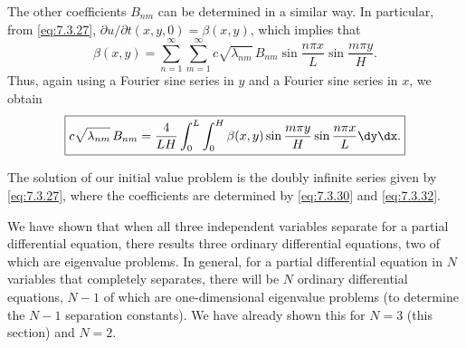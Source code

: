 The other coefficients $B_{nm}$ can be determined in a similar way.  In particular, from \eqref{eq:7.3.27}, $\partial u/\partial t(x,y,0) = \beta(x,y)$, which implies that
\begin{equation}
\beta(x,y) = \sum_{n=1}^{\infty}\sum_{m=1}^{\infty} c\sqrt{\lambda_{nm}}\,B_{nm}\sin\frac{n\pi x}{L}\sin\frac{m\pi y}{H}.
\label{eq:7.3.31}
\end{equation}
Thus, again using a Fourier sine series in $y$ and a Fourier sine series in $x$, we obtain
\begin{equation}
\boxed{c\sqrt{\lambda_{nm}}\,B_{nm} = \frac{4}{LH}\int_0^L\int_0^H \beta(x,y)\sin\frac{m\pi y}{H}\sin\frac{n\pi x}{L}\dy\dx.}
\label{eq:7.3.32}
\end{equation}

The solution of our initial value problem is the doubly infinite series given by \eqref{eq:7.3.27}, where the coefficients are determined by \eqref{eq:7.3.30} and \eqref{eq:7.3.32}.

We have shown that when all three independent variables separate for a partial differential equation, there results three ordinary differential equations, two of which are eigenvalue problems.  In general, for a partial differential equation in $N$ variables that completely separates, there will be $N$ ordinary differential equations, $N - 1$ of which are one-dimensional eigenvalue problems (to determine the $N - 1$ separation constants).  We have already shown this for $N = 3$ (this section) and $N = 2$.

